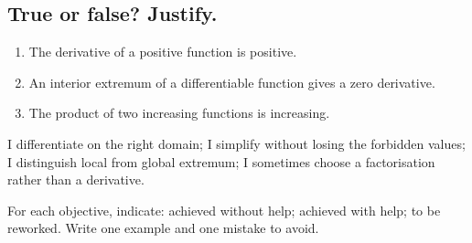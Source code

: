 \subsection*{True or false? Justify.}\label{C06-VF}
\begin{enumerate}
\item The derivative of a positive function is positive.
\item An interior extremum of a differentiable function gives a zero derivative.
\item The product of two increasing functions is increasing.
\end{enumerate}
\begin{keypoint}I differentiate on the right domain; I simplify without losing the forbidden values; I distinguish local from global extremum; I sometimes choose a factorisation rather than a derivative.

For each objective, indicate: achieved without help; achieved with help; to be reworked. Write one example and one mistake to avoid.\end{keypoint}
\endgroup
\ifmxteacher{}\fi
